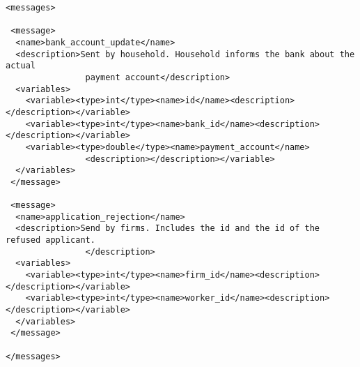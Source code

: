 \begin{mylisting}
\begin{verbatim}
<messages>

 <message>
  <name>bank_account_update</name>
  <description>Sent by household. Household informs the bank about the actual
                payment account</description>
  <variables>
    <variable><type>int</type><name>id</name><description></description></variable>
    <variable><type>int</type><name>bank_id</name><description></description></variable>
    <variable><type>double</type><name>payment_account</name>
                <description></description></variable>
  </variables>
 </message>

 <message>
  <name>application_rejection</name>
  <description>Send by firms. Includes the id and the id of the refused applicant.
                </description>
  <variables>
    <variable><type>int</type><name>firm_id</name><description></description></variable>
    <variable><type>int</type><name>worker_id</name><description></description></variable>
  </variables>
 </message>

</messages>
\end{verbatim}
\end{mylisting}
